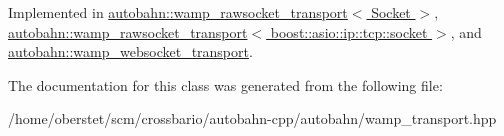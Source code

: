 Implemented in \hyperlink{classautobahn_1_1wamp__rawsocket__transport_a9659a6451e8fd027a08bfb39b8273b94}{autobahn\+::wamp\+\_\+rawsocket\+\_\+transport$<$ Socket $>$}, \hyperlink{classautobahn_1_1wamp__rawsocket__transport_a9659a6451e8fd027a08bfb39b8273b94}{autobahn\+::wamp\+\_\+rawsocket\+\_\+transport$<$ boost\+::asio\+::ip\+::tcp\+::socket $>$}, and \hyperlink{classautobahn_1_1wamp__websocket__transport_a0d8ded9c1d996bb5ef5b0a0247ad55cf}{autobahn\+::wamp\+\_\+websocket\+\_\+transport}.



The documentation for this class was generated from the following file\+:\begin{DoxyCompactItemize}
\item 
/home/oberstet/scm/crossbario/autobahn-\/cpp/autobahn/wamp\+\_\+transport.\+hpp\end{DoxyCompactItemize}
